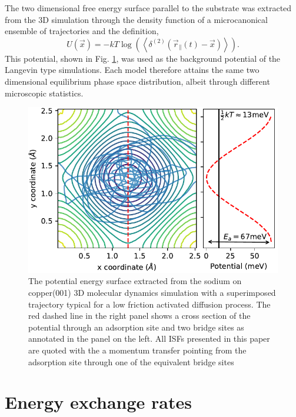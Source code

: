 \documentclass[7pt]{article}
\begin{document}
The two dimensional free energy surface parallel to the substrate was extracted from the 3D simulation through the density function of a microcanonical ensemble of trajectories and the definition,
\begin{equation}
	U(\vec{x}) = -kT\log\left(\left<\delta^{(2)}(\vec{r}_{\parallel}(t) - \vec{x})\right>\right).
	\label{eq:free_energy}
\end{equation}
This potential, shown in Fig. \ref{fig:pot_surface}, was used as the background potential of the Langevin type simulations. Each model therefore attains the same two dimensional equilibrium phase space distribution, albeit through different microscopic statistics. 

\begin{figure}
	\centering
	\includegraphics[width=1.0\columnwidth]{pot_surface}
	\caption{The potential energy surface extracted from the sodium on copper(001) 3D molecular dynamics simulation with a superimposed trajectory typical for a low friction activated diffusion process. The red dashed line in the right panel shows a cross section of the potential through an adsorption site and two bridge sites as annotated in the panel on the left. All ISFs presented in this paper are quoted with the a momentum transfer pointing from the adsorption site through one of the equivalent bridge sites}
	\label{fig:pot_surface}
\end{figure}

\section*{Energy exchange rates}
\end{document}
